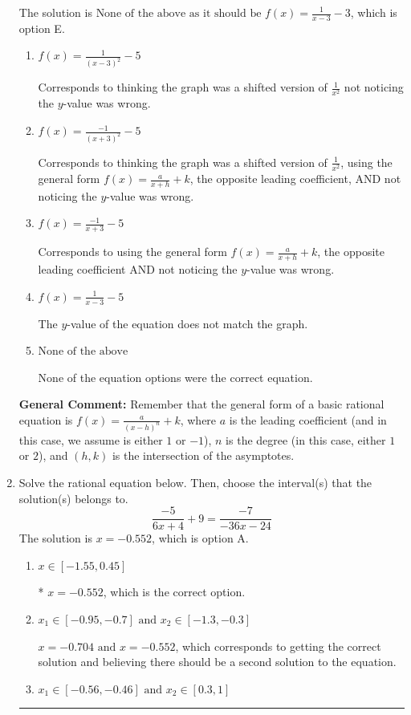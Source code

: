 \documentclass{extbook}[14pt]
\newcommand{\litem}[1]{\item #1

\rule{\textwidth}{0.4pt}}
\begin{document}
\begin{enumerate}
{The solution is \( \text{None of the above as it should be } f(x) = \frac{1}{x - 3} - 3 \), which is option E.\begin{enumerate}[label=\Alph*.]
\item \( f(x) = \frac{1}{(x - 3)^2} - 5 \)

Corresponds to thinking the graph was a shifted version of $\frac{1}{x^2}$ not noticing the $y$-value was wrong.
\item \( f(x) = \frac{-1}{(x + 3)^2} - 5 \)

Corresponds to thinking the graph was a shifted version of $\frac{1}{x^2}$, using the general form $f(x) = \frac{a}{x+h}+k$, the opposite leading coefficient, AND not noticing the $y$-value was wrong.
\item \( f(x) = \frac{-1}{x + 3} - 5 \)

Corresponds to using the general form $f(x) = \frac{a}{x+h}+k$, the opposite leading coefficient AND not noticing the $y$-value was wrong.
\item \( f(x) = \frac{1}{x - 3} - 5 \)

The $y$-value of the equation does not match the graph.
\item \( \text{None of the above} \)

None of the equation options were the correct equation.
\end{enumerate}

\textbf{General Comment:} Remember that the general form of a basic rational equation is $ f(x) = \frac{a}{(x-h)^n} + k$, where $a$ is the leading coefficient (and in this case, we assume is either $1$ or $-1$), $n$ is the degree (in this case, either $1$ or $2$), and $(h, k)$ is the intersection of the asymptotes.
}
\litem{
Solve the rational equation below. Then, choose the interval(s) that the solution(s) belongs to.
\[ \frac{-5}{6x + 4} + 9 = \frac{-7}{-36x -24} \]The solution is \( x = -0.552 \), which is option A.\begin{enumerate}[label=\Alph*.]
\item \( x \in [-1.55,0.45] \)

* $x = -0.552$, which is the correct option.
\item \( x_1 \in [-0.95, -0.7] \text{ and } x_2 \in [-1.3,-0.3] \)

$x = -0.704 \text{ and } x = -0.552$, which corresponds to getting the correct solution and believing there should be a second solution to the equation.
\item \( x_1 \in [-0.56, -0.46] \text{ and } x_2 \in [0.3,1] \)


\end{enumerate}}
\end{enumerate}
\end{document}
